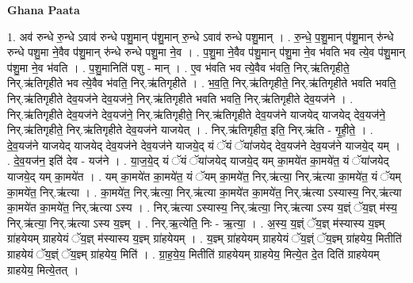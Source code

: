 \documentclass[17pt]{extarticle}
\begin{document}
\textbf{Ghana Paata } \newline

1. अव॑ रुन्धे रु॒न्धे ऽवाव॑ रुन्धे पशु॒मान् प॑शु॒मान् रु॒न्धे ऽवाव॑ रुन्धे पशु॒मान् । . रु॒न्धे॒ प॒शु॒मान् प॑शु॒मान् रु॑न्धे रुन्धे पशु॒मा ने॒वैव प॑शु॒मान् रु॑न्धे रुन्धे पशु॒मा ने॒व । . प॒शु॒मा ने॒वैव प॑शु॒मान् प॑शु॒मा ने॒व भ॑वति भव त्ये॒व प॑शु॒मान् प॑शु॒मा ने॒व भ॑वति । . प॒शु॒मानिति॑ पशु - मान् । . ए॒व भ॑वति भव त्ये॒वैव भ॑वति॒ निर्.ऋ॑तिगृहीते॒ निर्.ऋ॑तिगृहीते भव त्ये॒वैव भ॑वति॒ निर्.ऋ॑तिगृहीते । . भ॒व॒ति॒ निर्.ऋ॑तिगृहीते॒ निर्.ऋ॑तिगृहीते भवति भवति॒ निर्.ऋ॑तिगृहीते देव॒यज॑ने देव॒यज॑ने॒ निर्.ऋ॑तिगृहीते भवति भवति॒ निर्.ऋ॑तिगृहीते देव॒यज॑ने । . निर्.ऋ॑तिगृहीते देव॒यज॑ने देव॒यज॑ने॒ निर्.ऋ॑तिगृहीते॒ निर्.ऋ॑तिगृहीते देव॒यज॑ने याजयेद् याजयेद् देव॒यज॑ने॒ निर्.ऋ॑तिगृहीते॒ निर्.ऋ॑तिगृहीते देव॒यज॑ने याजयेत् । . निर्.ऋ॑तिगृहीत॒ इति॒ निर्.ऋ॑ति - गृ॒ही॒ते॒ । . दे॒व॒यज॑ने याजयेद् याजयेद् देव॒यज॑ने देव॒यज॑ने याजये॒द् यं ॅयं ॅया॑जयेद् देव॒यज॑ने देव॒यज॑ने याजये॒द् यम् । . दे॒व॒यज॑न॒ इति॑ देव - यज॑ने । . या॒ज॒ये॒द् यं ॅयं ॅया॑जयेद् याजये॒द् यम् का॒मये॑त का॒मये॑त॒ यं ॅया॑जयेद् याजये॒द् यम् का॒मये॑त । . यम् का॒मये॑त का॒मये॑त॒ यं ॅयम् का॒मये॑त॒ निर्.ऋ॑त्या॒ निर्.ऋ॑त्या का॒मये॑त॒ यं ॅयम् का॒मये॑त॒ निर्.ऋ॑त्या । . का॒मये॑त॒ निर्.ऋ॑त्या॒ निर्.ऋ॑त्या का॒मये॑त का॒मये॑त॒ निर्.ऋ॑त्या ऽस्यास्य॒ निर्.ऋ॑त्या का॒मये॑त का॒मये॑त॒ निर्.ऋ॑त्या ऽस्य । . निर्.ऋ॑त्या ऽस्यास्य॒ निर्.ऋ॑त्या॒ निर्.ऋ॑त्या ऽस्य य॒ज्ञ्ं ॅय॒ज्ञ् म॑स्य॒ निर्.ऋ॑त्या॒ निर्.ऋ॑त्या ऽस्य य॒ज्ञ्म् । . निर्.ऋ॒त्येति॒ निः - ऋ॒त्या॒ । . अ॒स्य॒ य॒ज्ञ्ं ॅय॒ज्ञ् म॑स्यास्य य॒ज्ञ्म् ग्रा॑हयेयम् ग्राहयेयं ॅय॒ज्ञ् म॑स्यास्य य॒ज्ञ्म् ग्रा॑हयेयम् । . य॒ज्ञ्म् ग्रा॑हयेयम् ग्राहयेयं ॅय॒ज्ञ्ं ॅय॒ज्ञ्म् ग्रा॑हयेय॒ मितीति॑ ग्राहयेयं ॅय॒ज्ञ्ं ॅय॒ज्ञ्म् ग्रा॑हयेय॒ मिति॑ । . ग्रा॒ह॒ये॒य॒ मितीति॑ ग्राहयेयम् ग्राहयेय॒ मित्ये॒त दे॒त दिति॑ ग्राहयेयम् ग्राहयेय॒ मित्ये॒तत् । \newline
\end{document}
